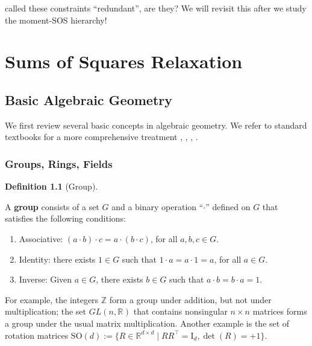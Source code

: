 \documentclass[
]{book}
\theoremstyle{definition}
\newtheorem{definition}{Definition}[chapter]
\theoremstyle{definition}
\theoremstyle{definition}
\theoremstyle{definition}
\theoremstyle{remark}
\begin{document}
\citep{briales18cvpr-certifiably} called these constraints ``redundant'', are they? We will revisit this after we study the moment-SOS hierarchy!

\chapter{Sums of Squares Relaxation}\label{SOS}

\section{Basic Algebraic Geometry}\label{basic-algebraic-geometry}

We first review several basic concepts in algebraic geometry. We refer to standard textbooks for a more comprehensive treatment \citep{bochnak13book-real}, \citep{cox13book-ideals}, \citep{dummit04book-abstract}, \citep{lang12book-algebra}.

\subsection{Groups, Rings, Fields}\label{groups-rings-fields}

\begin{definition}[Group]
\protect\hypertarget{def:Group}{}\label{def:Group}

A \textbf{group} consists of a set \(G\) and a binary operation ``\(\cdot\)'' defined on \(G\) that satisfies the following conditions:

\begin{enumerate}
\def\labelenumi{\arabic{enumi}.}
\item
  Associative: \((a \cdot b) \cdot c = a \cdot (b \cdot c)\), for all \(a,b,c \in G\).
\item
  Identity: there exists \(1 \in G\) such that \(1 \cdot a = a \cdot 1 = a\), for all \(a \in G\).
\item
  Inverse: Given \(a \in G\), there exists \(b \in G\) such that \(a \cdot b = b \cdot a = 1\).
\end{enumerate}

\end{definition}

For example, the integers \(\mathbb{Z}\) form a group under addition, but not under multiplication; the set \(GL(n,\mathbb{R}^{})\) that contains nonsingular \(n \times n\) matrices forms a group under the usual matrix multiplication. Another example is the set of rotation matrices \(\mathrm{SO}(d):= \{ R \in \mathbb{R}^{d \times d} \mid RR^\top= \mathrm{I}_d, \det(R) = +1 \}\).
\end{document}
